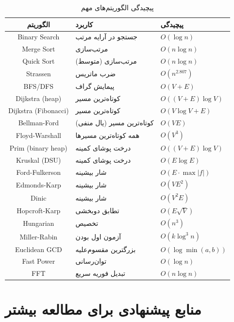 \documentclass{matinbook}
\begin{document}
    \begin{table}[h]
        \centering
        \caption{پیچیدگی الگوریتم‌های مهم}
        \label{tab:algorithm-complexity}
        \begin{tabular}{|c|C{5cm}|C{4cm}|}
            \hline
            \textbf{الگوریتم} & \textbf{کاربرد} & \textbf{پیچیدگی} \\
            \hline
            Binary Search & جستجو در آرایه مرتب & $O(\log n)$ \\
            Merge Sort & مرتب‌سازی & $O(n \log n)$ \\
            Quick Sort & مرتب‌سازی (متوسط) & $O(n \log n)$ \\
            Strassen & ضرب ماتریس & $O(n^{2.807})$ \\
            BFS/DFS & پیمایش گراف & $O(V + E)$ \\
            Dijkstra (heap) & کوتاه‌ترین مسیر & $O((V+E)\log V)$ \\
            Dijkstra (Fibonacci) & کوتاه‌ترین مسیر & $O(V\log V + E)$ \\
            Bellman-Ford & کوتاه‌ترین مسیر (یال منفی) & $O(VE)$ \\
            Floyd-Warshall & همه کوتاه‌ترین مسیرها & $O(V^{3})$ \\
            Prim (binary heap) & درخت پوشای کمینه & $O((V+E)\log V)$ \\
            Kruskal (DSU) & درخت پوشای کمینه & $O(E\log E)$ \\
            Ford-Fulkerson & شار بیشینه & $O(E\cdot \max|f|)$ \\
            Edmonds-Karp & شار بیشینه & $O(VE^{2})$ \\
            Dinic & شار بیشینه & $O(V^{2}E)$ \\
            Hopcroft-Karp & تطابق دوبخشی & $O(E\sqrt{V})$ \\
            Hungarian & تخصیص & $O(n^{3})$ \\
            Miller-Rabin & آزمون اول بودن & $O(k\log^{3} n)$ \\
            Euclidean GCD & بزرگترین مقسوم‌علیه & $O(\log \min(a,b))$ \\
            Fast Power & توان‌رسانی & $O(\log n)$ \\
            FFT & تبدیل فوریه سریع & $O(n \log n)$ \\
            \hline
        \end{tabular}
    \end{table}
    
    \chapter{منابع پیشنهادی برای مطالعه بیشتر}
    \label{app:further-reading}
    
\end{document}
